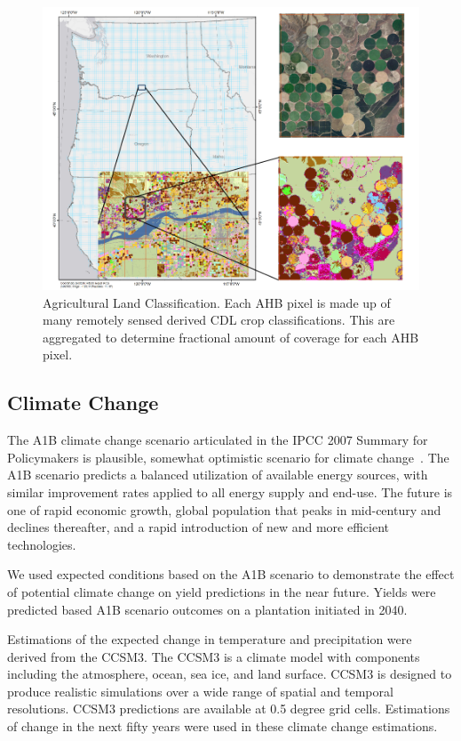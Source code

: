 \documentclass[preprint,review,12pt]{elsarticle}
\begin{document}
\begin{figure}[hp]
  \centering
  \includegraphics[width=1\linewidth]{land.png}
  \caption{Agricultural Land Classification.  Each \ac{AHB} pixel is made up of
    many remotely sensed derived \ac{CDL} crop classifications.  This
    are aggregated to determine fractional amount of coverage for each
    \ac{AHB} pixel. }
  \label{fig:land}
\end{figure}

\subsection{Climate Change}

The A1B climate change scenario
articulated in the \ac{IPCC} 2007 Summary for Policymakers is
plausible, somewhat optimistic
scenario for climate change~\cite{IPCC2007,Parry2007}. The A1B scenario predicts a balanced utilization of available energy
sources, with similar improvement rates applied to all energy supply
and end-use.  The future is one of rapid economic growth, global
population that peaks in mid-century and declines thereafter, and a
rapid introduction of new and more efficient
technologies. 

We used expected conditions based on the A1B
scenario to demonstrate the effect of potential climate change on yield
predictions in the near future. Yields were predicted based A1B scenario outcomes on a
plantation initiated in 2040.

Estimations of the expected change in temperature and precipitation were derived from the \ac{CCSM3}.  The \ac{CCSM3} is a climate model
with components including the atmosphere, ocean, sea ice, and land
surface. \ac{CCSM3} is designed to produce realistic simulations over
a wide range of spatial and temporal resolutions.  \ac{CCSM3}
predictions are available at 0.5 degree grid cells.  Estimations of
change in the next fifty years were used in these climate change
estimations.
\end{document}
